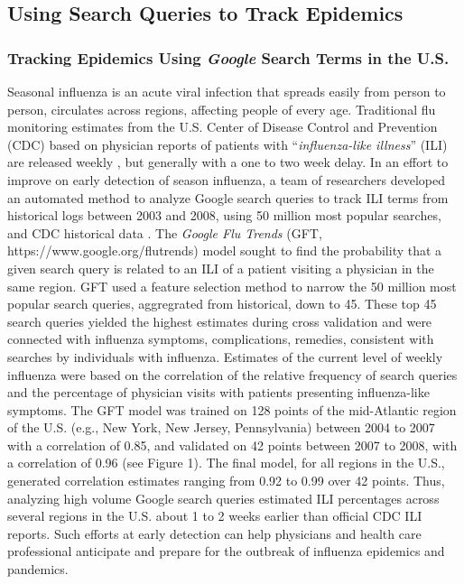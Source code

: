 \documentclass[sigconf]{acmart}
\begin{document}
\subsection{Using Search Queries to Track Epidemics}

\subsubsection{Tracking Epidemics Using {\itshape Google} Search Terms in the U.S.}

Seasonal influenza is an acute viral infection that spreads easily from person to 
person, circulates across regions, affecting people of every age. Traditional flu 
monitoring estimates from the U.S. Center of Disease Control and Prevention (CDC) 
based on physician reports of patients with ``{\it influenza-like illness}'' (ILI) are 
released weekly \cite{cdc17}, but generally with a one to two week delay. In an effort 
to improve on early detection of season influenza, a team of researchers developed an 
automated method to analyze Google search queries to track ILI terms from historical 
logs between 2003 and 2008, using 50 million most popular searches, and CDC historical 
data \cite{ginsburg09}. The {\it Google Flu Trends} (GFT, https://www.google.org/flutrends)
model sought to find the probability that a given search query is related to an ILI of a 
patient visiting a physician in the same region. GFT used a feature selection method to 
narrow the 50 million most popular search queries, aggregrated from historical, down to 
45. These top 45 search queries yielded the highest estimates during cross validation 
and were connected with influenza symptoms, complications, remedies, consistent with 
searches by individuals with influenza. Estimates of the current level of weekly 
influenza were based on the correlation of the relative frequency of search queries 
and the percentage of physician visits with patients presenting influenza-like symptoms. 
The GFT model was trained on 128 points of the mid-Atlantic region of the U.S. (e.g., 
New York, New Jersey, Pennsylvania) between 2004 to 2007 with a correlation of 0.85, 
and validated on 42 points between 2007 to 2008, with a correlation of 0.96 (see Figure 1). 
The final model, for all regions in the U.S., generated correlation estimates ranging 
from 0.92 to 0.99 over 42 points. Thus, analyzing high volume Google search queries 
estimated ILI percentages across several regions in the U.S. about 1 to 2 weeks 
earlier than official CDC ILI reports. Such efforts at early detection can help 
physicians and health care professional anticipate and prepare for the outbreak 
of influenza epidemics and pandemics. 
\end{document}
